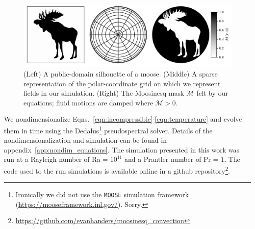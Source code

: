 \begin{figure}[t!]
\centering
\includegraphics[width=\textwidth]{paper_figure01.pdf}
    \caption{ 
        (Left) A public-domain silhouette of a moose.
        (Middle) A sparse representation of the polar-coordinate grid on which we represent fields in our simulation.
        (Right) The Moosinesq mask $\mathcal{M}$ felt by our equations; fluid motions are damped where $\mathcal{M} > 0$.
        \label{fig:methods}
    }
\end{figure}

We nondimensionalize Eqns.~\ref{eqn:incompressible}-\ref{eqn:temperature} and evolve them in time using the Dedalus\footnote{Ironically we did not use the \texttt{MOOSE} simulation framework (\url{https://mooseframework.inl.gov/}). Sorry.} \citep{burns_etal_2020} pseudospectral solver.
Details of the nondimensionalization and simulation can be found in appendix~\ref{app:nondim_equations}.
The simulation presented in this work was run at a Rayleigh number of Ra = $10^{11}$ and a Prantler number of Pr = $1$.
The code used to the run simulations is available online in a github repository\footnote{\url{https://github.com/evanhanders/moosinesq_convection}}.

